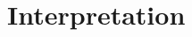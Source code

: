 \documentclass[Bachelorarbeit.tex]{subfiles}
\begin{document}
\chapter{Interpretation}
\end{document}
